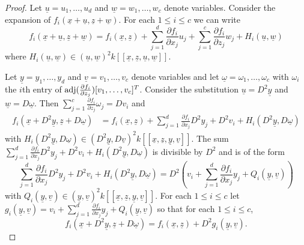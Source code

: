 \documentclass[12pt]{amsart}
\numberwithin{equation}{theorem}
\theoremstyle{plain}
\begin{document}
\begin{proof}
    Let $\underline{u} = u_1,\ldots,u_d$ and $\underline{w} = w_1,\ldots,w_c$ denote variables. Consider the expansion of $f_i(\underline{x}+\underline{u},\underline{z}+\underline{w})$. For each $1\leq i\leq c$ we can write
    \[
    f_i(\underline{x}+\underline{u},\underline{z}+\underline{w}) = f_i(\underline{x},\underline{z}) + \sum_{j = 1}^d\frac{\partial f_i}{\partial x_j}u_j + \sum_{j=1}^c\frac{\partial f_i}{\partial z_j}w_j + H_i(\underline{u},\underline{w})
    \]
    where $H_i(\underline{u},\underline{w})\in (\underline{u},\underline{w})^2k[[\underline{x},\underline{z},\underline{u},\underline{w}]]$.

    Let $\underline{y} = y_1,\ldots,y_d$ and $\underline{v} = v_1,\ldots,v_c$ denote variables and let $\underline{\omega} = \omega_1,\ldots,\omega_c$ with $\omega_i$ the $i$th entry of $\operatorname{{adj}}(\frac{\partial f_i}{\partial z_j})[v_1,\ldots,v_c]^T$. Consider the substitution $\underline{u} = D^2\underline{y}$ and $\underline{w} = D \underline{\omega}$. Then $\sum_{j=1}^c\frac{\partial f_i}{\partial z_j}\omega_j = D v_i$ and
    \begin{align*}
        f_i(\underline{x}+D^2\underline{y},\underline{z}+D \underline{\omega}) &= f_i(\underline{x},\underline{z}) + \sum_{j = 1}^d\frac{\partial f_i}{\partial x_j}D^2y_j + D^2 v_i + H_i(D^2\underline{y},D \underline{\omega})
    \end{align*}
    with $H_i(D^2\underline{y},D \underline{\omega})\in (D^2\underline{y},D\underline{v})^2k[[\underline{x},\underline{z},\underline{y},\underline{v}]]$. The sum $\sum_{j = 1}^d\frac{\partial f_i}{\partial x_j}D^2y_j + D^2 v_i + H_i(D^2\underline{y},D \underline{\omega})$ is divisible by $D^2$ and is of the form
    \[
    \sum_{j = 1}^d\frac{\partial f_i}{\partial x_j}D^2y_j + D^2 v_i + H_i(D^2\underline{y},D \underline{\omega}) = D^2\left(v_i+\sum_{j=1}^d\frac{\partial f_i}{\partial x_j}y_j+Q_i(\underline{y},\underline{v})\right)
    \]
    with $Q_i(\underline{y},\underline{v})\in (\underline{y},\underline{v})^2
    k[[\underline{x},\underline{z},\underline{y},\underline{v}]]$. For each $1\leq i\leq c$ let $g_i(\underline{y},\underline{v}) = v_i+\sum_{j=1}^d\frac{\partial f_i}{\partial x_j}y_j+Q_i(\underline{y},\underline{v})$ so that for each $1\leq i\leq c$,
    \begin{equation}
        \label{eq: subsitution for f}
        f_i(\underline{x}+D^2\underline{y},\underline{z}+D \underline{\omega}) = f_i(\underline{x},\underline{z}) + D^2g_i(\underline{y},\underline{v}).
    \end{equation}
    

\end{proof}
\end{document}

